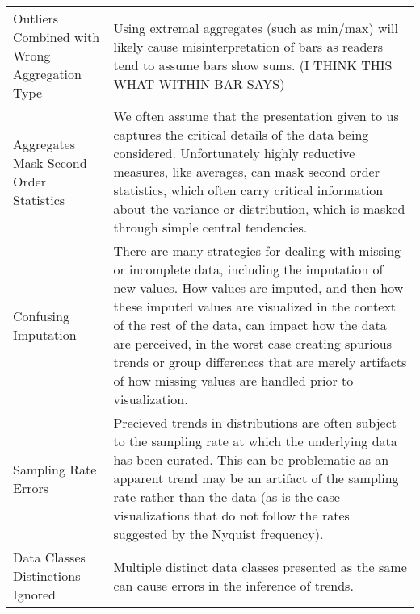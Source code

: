 \begin{longtable}{p{3cm}p{14cm}}
 \rowcolor{colorb-opaque}Outliers Combined with Wrong Aggregation Type & Using extremal aggregates (such as min/max) will likely cause misinterpretation of bars as readers tend to assume bars show sums. (I THINK THIS WHAT WITHIN BAR SAYS) \cite{newman2012bar}\\
 \rowcolor{colorb}Aggregates Mask Second Order Statistics  & We often assume that the presentation given to us captures the critical details of the data being considered. Unfortunately highly reductive measures, like averages, can mask second order statistics, which often carry critical information about the variance or distribution, which is masked through simple central tendencies.  \cite{wall2017warning, few2019loom, matejka2017same, anscombe1973graphs, salimi2018bias}\\
 \rowcolor{colorb-opaque}Confusing Imputation  & There are many strategies for dealing with missing or incomplete data, including the imputation of new values. How values are imputed, and then how these imputed values are visualized in the context of the rest of the data, can impact how the data are perceived, in the worst case creating spurious trends or group differences that are merely artifacts of how missing values are handled prior to visualization. \cite{song2018s}\\
 \rowcolor{colorb}Sampling Rate Errors  & Precieved trends in distributions are often subject to the sampling rate at which the underlying data has been curated. This can be problematic as an apparent trend may be an artifact of the sampling rate rather than the data (as is the case visualizations that do not follow the rates suggested by the Nyquist frequency). \cite{kindlmann2014algebraic}\\
 \rowcolor{colorb-opaque}Data Classes Distinctions Ignored & Multiple distinct data classes presented as the same can cause errors in the inference of trends. \cite{anand2015automatic}\\


\end{longtable}
